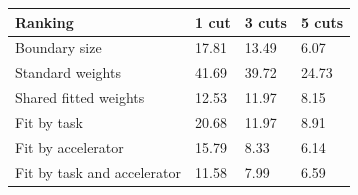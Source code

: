 \begin{tabular}{@{}llll@{}}
\toprule
Ranking & 1 cut & 3 cuts & 5 cuts \\
\midrule
Boundary size & 17.81 & 13.49 & 6.07 \\
Standard weights & 41.69 & 39.72 & 24.73 \\
Shared fitted weights & 12.53 & 11.97 & 8.15 \\
Fit by task & 20.68 & 11.97 & 8.91 \\
Fit by accelerator & 15.79 & 8.33 & 6.14 \\
Fit by task and accelerator & 11.58 & 7.99 & 6.59 \\
\bottomrule
\end{tabular}
